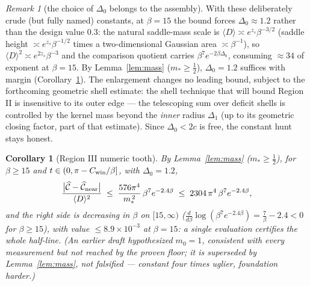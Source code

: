 \documentclass[11pt]{article}
\newtheorem{corollary}[theorem]{Corollary}
\theoremstyle{remark}
\newtheorem{remark}[theorem]{Remark}
\begin{document}
\begin{remark}[the choice of $\Delta_0$ belongs to the assembly]
With these deliberately crude (but fully named) constants, at
$\beta=15$ the bound forces $\Delta_0\approx1.2$ rather than the
design value $0.3$: the natural saddle-mass scale is
$\langle D\rangle\asymp e^{z_s}\beta^{-3/2}$ (saddle height
$\asymp e^{z_s}\beta^{-1/2}$ times a two-dimensional Gaussian area
$\asymp\beta^{-1}$), so $\langle D\rangle^2\asymp
e^{2z_s}\beta^{-3}$ and the comparison quotient carries
$\beta^{7}e^{-2\beta\Delta_0}$, consuming
$\approx34$ of exponent at $\beta=15$. By Lemma~\ref{lem:mass}
\textup{(}$m_*\ge\tfrac12$\textup{)},
$\Delta_0=1.2$ suffices with margin
(Corollary~\ref{cor:regIIInum}). The enlargement changes no leading
bound, subject to the forthcoming geometric shell estimate: the
shell technique that will bound Region II is insensitive to its
outer edge --- the telescoping sum over deficit shells is
controlled by the kernel mass beyond the \emph{inner} radius
$\Delta_1$ (up to its geometric closing factor, part of that
estimate). Since $\Delta_0<2c$ is free, the constant hunt stays
honest.
\end{remark}

\begin{corollary}[Region III numeric tooth]
\label{cor:regIIInum}
By Lemma~\ref{lem:mass}
\textup{(}$m_*\ge\tfrac12$\textup{)}, for
$\beta\ge15$ and $t\in(0,\pi-C_{\rm win}/\beta]$, with
$\Delta_0=1.2$,
\[
\frac{\bigl|\widehat{\mathcal C}-\widehat{\mathcal C}_{\rm near}\bigr|}
{\langle D\rangle^2}
\;\le\;\frac{576\pi^4}{m_*^{\,2}}\,\beta^{7}e^{-2.4\beta}
\;\le\;2304\,\pi^4\,\beta^{7}e^{-2.4\beta},
\]
and the right side is decreasing in $\beta$ on $[15,\infty)$
\textup{(}$\frac{d}{d\beta}\log(\beta^7e^{-2.4\beta})
=\tfrac7\beta-2.4<0$ for $\beta\ge15$\textup{)}, with value
$\le8.9\times10^{-3}$ at $\beta=15$: a single evaluation certifies
the whole half-line. \textup{(}An earlier draft hypothesized
$m_0=1$, consistent with every measurement but not reached by the
proven floor; it is superseded by Lemma~\ref{lem:mass}, not
falsified --- constant four times uglier, foundation
harder.\textup{)}
\end{corollary}
\end{document}
